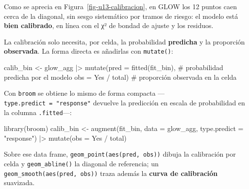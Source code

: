 \documentclass[
  letterpaper,
  DIV=11,
  numbers=noendperiod]{scrartcl}
\newenvironment{Shaded}{\begin{snugshade}}{\end{snugshade}}
\newcommand{\AttributeTok}[1]{\textcolor[rgb]{0.40,0.45,0.13}{#1}}
\newcommand{\CommentTok}[1]{\textcolor[rgb]{0.37,0.37,0.37}{#1}}
\newcommand{\FunctionTok}[1]{\textcolor[rgb]{0.28,0.35,0.67}{#1}}
\newcommand{\NormalTok}[1]{\textcolor[rgb]{0.00,0.23,0.31}{#1}}
\newcommand{\OtherTok}[1]{\textcolor[rgb]{0.00,0.23,0.31}{#1}}
\newcommand{\SpecialCharTok}[1]{\textcolor[rgb]{0.37,0.37,0.37}{#1}}
\newcommand{\StringTok}[1]{\textcolor[rgb]{0.13,0.47,0.30}{#1}}
\begin{document}
Como se aprecia en Figura~\ref{fig-u13-calibracion}, en GLOW los 12
puntos caen cerca de la diagonal, sin sesgo sistemático por tramos de
riesgo: el modelo está \textbf{bien calibrado}, en línea con el χ² de
bondad de ajuste y los residuos.

\begin{tcolorbox}[enhanced jigsaw, breakable, colframe=quarto-callout-tip-color-frame, left=2mm, arc=.35mm, colbacktitle=quarto-callout-tip-color!10!white, toprule=.15mm, colback=white, coltitle=black, rightrule=.15mm, opacitybacktitle=0.6, title=\textcolor{quarto-callout-tip-color}{\faLightbulb}\hspace{0.5em}{🔧 En R. El data frame de observados vs predichos para la calibración}, titlerule=0mm, toptitle=1mm, bottomtitle=1mm, leftrule=.75mm, bottomrule=.15mm, opacityback=0]

La calibración solo necesita, por celda, la probabilidad
\textbf{predicha} y la proporción \textbf{observada}. La forma directa
es añadirlas con \texttt{mutate()}:

\begin{Shaded}
\begin{Highlighting}[]
\NormalTok{calib\_bin }\OtherTok{\textless{}{-}}\NormalTok{ glow\_agg }\SpecialCharTok{|\textgreater{}}
  \FunctionTok{mutate}\NormalTok{(}\AttributeTok{pred =} \FunctionTok{fitted}\NormalTok{(fit\_bin),     }\CommentTok{\# probabilidad predicha por el modelo}
         \AttributeTok{obs  =}\NormalTok{ Yes }\SpecialCharTok{/}\NormalTok{ total)         }\CommentTok{\# proporción observada en la celda}
\end{Highlighting}
\end{Shaded}

Con \texttt{broom} se obtiene lo mismo de forma compacta
---\texttt{type.predict\ =\ "response"} devuelve la predicción en escala
de probabilidad en la columna \texttt{.fitted}---:

\begin{Shaded}
\begin{Highlighting}[]
\FunctionTok{library}\NormalTok{(broom)}
\NormalTok{calib\_bin }\OtherTok{\textless{}{-}} \FunctionTok{augment}\NormalTok{(fit\_bin, }\AttributeTok{data =}\NormalTok{ glow\_agg, }\AttributeTok{type.predict =} \StringTok{"response"}\NormalTok{) }\SpecialCharTok{|\textgreater{}}
  \FunctionTok{mutate}\NormalTok{(}\AttributeTok{obs =}\NormalTok{ Yes }\SpecialCharTok{/}\NormalTok{ total)}
\end{Highlighting}
\end{Shaded}

Sobre ese data frame, \texttt{geom\_point(aes(pred,\ obs))} dibuja la
calibración por celda y \texttt{geom\_abline()} la diagonal de
referencia; un \texttt{geom\_smooth(aes(pred,\ obs))} traza además la
\textbf{curva de calibración} suavizada.

\end{tcolorbox}
\end{document}

